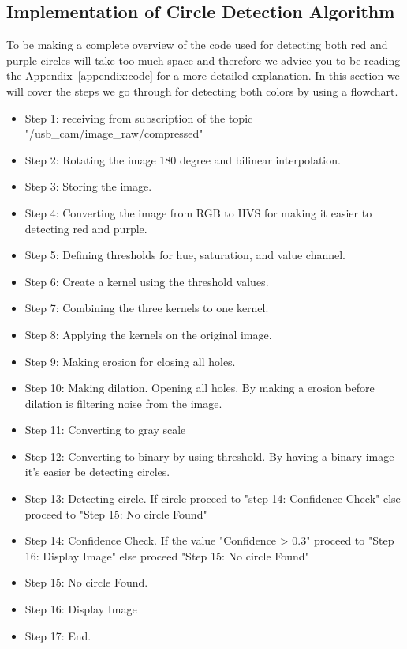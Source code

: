 \documentclass{article}
\begin{document}
	\subsection{Implementation of Circle Detection Algorithm}
	To be making a complete overview of the code used for detecting both red and purple circles will take too much space and therefore we advice you to be reading the Appendix~\ref{appendix:code} for a more detailed explanation. In this section we will cover the steps we go through for detecting both colors by using a flowchart.
	\begin{itemize}
		\item Step 1: receiving from subscription of the topic "/usb\_cam/image\_raw/compressed"
		
		\item Step 2: Rotating the image 180 degree and bilinear interpolation.
		
		\item Step 3: Storing the image.
		
		\item Step 4: Converting the image from RGB to HVS for making it easier to detecting red and purple.
		
		\item Step 5: Defining thresholds for hue, saturation, and value channel.
		
		\item Step 6: Create a kernel using the threshold values.
		
		\item Step 7: Combining the three kernels to one kernel.
		
		\item Step 8: Applying the kernels on the original image.
		
		\item Step 9: Making erosion for closing all holes.
		
		\item Step 10: Making dilation. Opening all holes. By making a erosion before dilation is filtering noise from the image.
		
		\item Step 11: Converting to gray scale
		
		\item Step 12: Converting to binary by using threshold. By having a binary image it's easier be detecting circles.
		
		\item Step 13: Detecting circle. If circle proceed to "step 14: Confidence Check" else proceed to "Step 15: No circle Found"
		
		\item Step 14: Confidence Check. If the value "Confidence > 0.3" proceed to "Step 16: Display Image" else proceed "Step 15: No circle Found"
		
		\item Step 15: No circle Found.
		
		\item Step 16: Display Image
		
		\item Step 17: End.
	\end{itemize}
\end{document}
